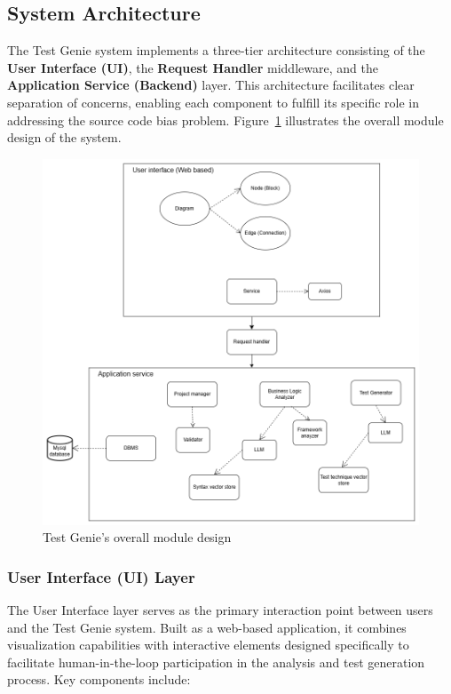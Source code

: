 \subsection{System Architecture}

\hspace{0.5cm}The Test Genie system implements a three-tier architecture consisting of the \textbf{User Interface (UI)}, the \textbf{Request Handler} middleware, and the \textbf{Application Service (Backend)} layer. This architecture facilitates clear separation of concerns, enabling each component to fulfill its specific role in addressing the source code bias problem. Figure~\ref{fig:system-design} illustrates the overall module design of the system.

\begin{figure}[H]
	\centering
	\includegraphics[width=1.0\textwidth]{images/System design.drawio.png}
	\caption{Test Genie's overall module design}
	\label{fig:system-design}
\end{figure}

\subsubsection{User Interface (UI) Layer}

\hspace{0.5cm}The User Interface layer serves as the primary interaction point between users and the Test Genie system. Built as a web-based application, it combines visualization capabilities with interactive elements designed specifically to facilitate human-in-the-loop participation in the analysis and test generation process. Key components include:

